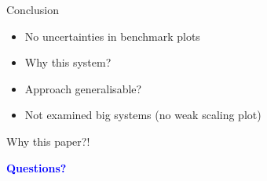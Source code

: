 \documentclass{beamer}
\begin{document}
\begin{frame}{Conclusion}
\begin{itemize} \pause
    \item No uncertainties in benchmark plots \pause
    \item Why this system? \pause
    \item Approach generalisable? \pause
    \item Not examined big systems (no weak scaling plot) \pause
\end{itemize}
\begin{highlightbox}
    Why this paper?!
\end{highlightbox}
\end{frame}

\begin{frame}
\centering
\textcolor{blue}{\textbf{\Huge{Questions?}}}
\end{frame}
\end{document}
